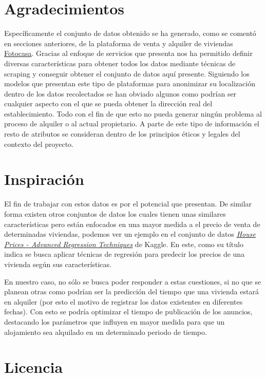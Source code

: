 \section{Agradecimientos}

Específicamente el conjunto de datos obtenido se ha generado, como se comentó en secciones anteriores, de la plataforma de 
venta y alquiler de viviendas \href{https://www.fotocasa.es/es/}{Fotocasa}. Gracias al enfoque de servicios que presenta nos 
ha permitido definir diversas características para obtener todos los datos mediante técnicas de scraping y conseguir obtener 
el conjunto de datos aquí presente. Siguiendo los modelos que presentan este tipo de plataformas para anonimizar su 
localización dentro de los datos recolectados se han obviado algunos como podrían ser cualquier aspecto con el que se 
pueda obtener la dirección real del establecimiento. Todo con el fin de que esto no pueda generar ningún problema al 
proceso de alquiler o al actual propietario. A parte de este tipo de información el resto de atributos se consideran dentro 
de los principios éticos y legales del contexto del proyecto.

\section{Inspiración}

El fin de trabajar con estos datos es por el potencial que presentan. De similar forma existen otros conjuntos de datos los 
cuales tienen unas similares características pero están enfocados en una mayor medida a el precio de venta de determinadas 
viviendas, podemos ver un ejemplo en el conjunto de datos 
\textit{\href{https://www.kaggle.com/c/house-prices-advanced-regression-techniques}{House Prices - Advanced Regression Techniques}} 
de Kaggle. En este, como su título indica se busca aplicar técnicas de regresión para predecir los precios de una vivienda según 
sus características.

En nuestro caso, no sólo se busca poder responder a estas cuestiones, si no que se planean otras como podrían ser la predicción 
del tiempo que una vivienda estará en alquiler (por esto el motivo de registrar los datos existentes en diferentes fechas). Con 
esto se podría optimizar el tiempo de publicación de los anuncios, destacando los parámetros que influyen en mayor medida para 
que un alojamiento sea alquilado en un determinado periodo de tiempo.

\section{Licencia}

